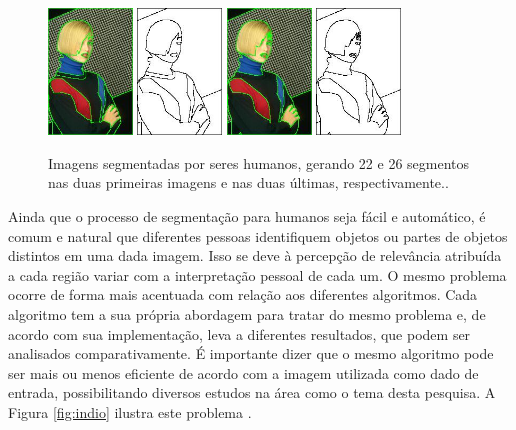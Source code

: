 \begin{figure}[!h]
 \centering
 \def\baselinestretch{1}\small\normalsize
 \includegraphics[width=0.2\textwidth]{img/198023-22-color.jpg}\qquad
 \includegraphics[width=0.2\textwidth]{img/198023-22.jpg}  \qquad
  \includegraphics[width=0.2\textwidth]{img/198023-26-color.jpg}  \qquad
 \includegraphics[width=0.2\textwidth]{img/198023-26.jpg}        
 \caption{\label{fig:Berkeley_mulher_segmentada2}Imagens segmentadas por seres humanos, gerando 22 e 26 segmentos nas duas primeiras imagens e nas duas últimas, respectivamente.\citep{Arbelez2011}.}
\end{figure}




Ainda que o processo de segmentação para humanos seja fácil e automático, é comum e natural que diferentes pessoas identifiquem objetos ou partes de objetos distintos em uma dada imagem. Isso se deve à percepção de relevância atribuída a cada região variar com a interpretação pessoal de cada um. 
O mesmo problema ocorre de forma mais acentuada com relação aos diferentes algoritmos. Cada algoritmo tem a sua própria abordagem para tratar do mesmo problema e, de acordo com sua implementação, leva a diferentes resultados, que podem ser analisados comparativamente. É importante dizer que o mesmo algoritmo pode ser mais ou menos eficiente de acordo com a imagem utilizada como dado de entrada, possibilitando diversos estudos na área como o tema desta pesquisa. A Figura \ref{fig:indio} ilustra este problema\citep{berkeley} . 

